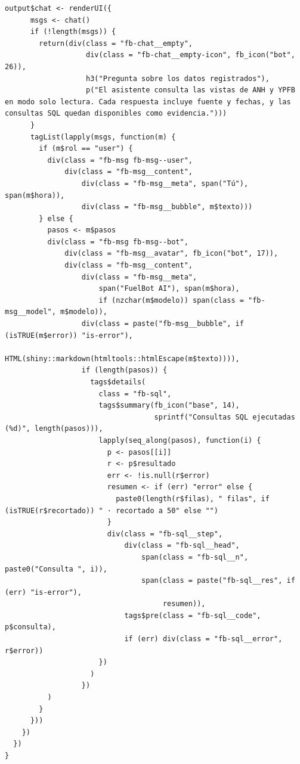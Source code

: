 \begin{lstlisting}[style=anexoR]
    output$chat <- renderUI({
      msgs <- chat()
      if (!length(msgs)) {
        return(div(class = "fb-chat__empty",
                   div(class = "fb-chat__empty-icon", fb_icon("bot", 26)),
                   h3("Pregunta sobre los datos registrados"),
                   p("El asistente consulta las vistas de ANH y YPFB en modo solo lectura. Cada respuesta incluye fuente y fechas, y las consultas SQL quedan disponibles como evidencia.")))
      }
      tagList(lapply(msgs, function(m) {
        if (m$rol == "user") {
          div(class = "fb-msg fb-msg--user",
              div(class = "fb-msg__content",
                  div(class = "fb-msg__meta", span("Tú"), span(m$hora)),
                  div(class = "fb-msg__bubble", m$texto)))
        } else {
          pasos <- m$pasos
          div(class = "fb-msg fb-msg--bot",
              div(class = "fb-msg__avatar", fb_icon("bot", 17)),
              div(class = "fb-msg__content",
                  div(class = "fb-msg__meta",
                      span("FuelBot AI"), span(m$hora),
                      if (nzchar(m$modelo)) span(class = "fb-msg__model", m$modelo)),
                  div(class = paste("fb-msg__bubble", if (isTRUE(m$error)) "is-error"),
                      HTML(shiny::markdown(htmltools::htmlEscape(m$texto)))),
                  if (length(pasos)) {
                    tags$details(
                      class = "fb-sql",
                      tags$summary(fb_icon("base", 14),
                                   sprintf("Consultas SQL ejecutadas (%d)", length(pasos))),
                      lapply(seq_along(pasos), function(i) {
                        p <- pasos[[i]]
                        r <- p$resultado
                        err <- !is.null(r$error)
                        resumen <- if (err) "error" else {
                          paste0(length(r$filas), " filas", if (isTRUE(r$recortado)) " · recortado a 50" else "")
                        }
                        div(class = "fb-sql__step",
                            div(class = "fb-sql__head",
                                span(class = "fb-sql__n", paste0("Consulta ", i)),
                                span(class = paste("fb-sql__res", if (err) "is-error"),
                                     resumen)),
                            tags$pre(class = "fb-sql__code", p$consulta),
                            if (err) div(class = "fb-sql__error", r$error))
                      })
                    )
                  })
          )
        }
      }))
    })
  })
}
\end{lstlisting}
